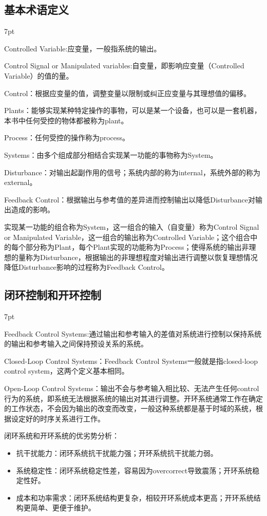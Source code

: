 \documentclass{article}
\numberwithin{equation}{section}
\numberwithin{figure}{section}
\newenvironment{formal}{%
\def\FrameCommand{%
\hspace{1pt}%
{\color{DarkBlue}\vrule width 2pt}%
{\color{formalshade}\vrule width 4pt}%
\colorbox{formalshade}%
}%
\MakeFramed{\advance\hsize-\width\FrameRestore}%
\noindent\hspace{-4.55pt}%
\begin{adjustwidth}{}{7pt}%
\vspace{2pt}\vspace{2pt}%
}
{%
\vspace{2pt}\end{adjustwidth}\endMakeFramed%
}
\begin{document}
\subsection{基本术语定义}
\begin{formal}
    \item Controlled Variable:应变量，一般指系统的输出。
    \item Control Signal or Manipulated variables:自变量，即影响应变量（Controlled Variable）的值的量。
    \item Control：根据应变量的值，调整变量以限制或纠正应变量与其理想值的偏移。
    \item Plants：能够实现某种特定操作的事物，可以是某一个设备，也可以是一套机器，本书中任何受控的物体都被称为plant。
    \item Process：任何受控的操作称为process。
    \item Systems：由多个组成部分相结合实现某一功能的事物称为System。
    \item Disturbance：对输出起副作用的信号；系统内部的称为internal，系统外部的称为external。
    \item Feedback Control：根据输出与参考值的差异进而控制输出以降低Disturbance对输出造成的影响。
    \item 
\end{formal}
实现某一功能的组合称为System，这一组合的输入（自变量）称为Control Signal or Manipulated Variable，这一组合的输出称为Controlled Variable；这个组合中的每个部分称为Plant，每个Plant实现的功能称为Process；使得系统的输出非理想的量称为Disturbance，根据输出的非理想程度对输出进行调整以恢复理想情况降低Disturbance影响的过程称为Feedback Control。
\subsection{闭环控制和开环控制}
\begin{formal}
    \item Feedback Control Systems:通过输出和参考输入的差值对系统进行控制以保持系统的输出和参考输入之间保持预设关系的系统。
    \item Closed-Loop Control Systems：Feedback Control Systems一般就是指closed-loop control system，这两个定义基本相同。
    \item Open-Loop Control Systems：输出不会与参考输入相比较、无法产生任何control行为的系统，即系统无法根据系统的输出对其进行调整。开环系统通常工作在确定的工作状态，不会因为输出的改变而改变，一般这种系统都是基于时域的系统，根据设定好的时序关系进行工作。
    \item 
\end{formal}
闭环系统和开环系统的优劣势分析：
\begin{itemize}
    \item 抗干扰能力：闭环系统抗干扰能力强；开环系统抗干扰能力弱。
    \item 系统稳定性：闭环系统稳定性差，容易因为overcorrect导致震荡；开环系统稳定性好。
    \item 成本和功率需求：闭环系统结构更复杂，相较开环系统成本更高；开环系统结构更简单、更便于维护。
\end{itemize}
\end{document}
